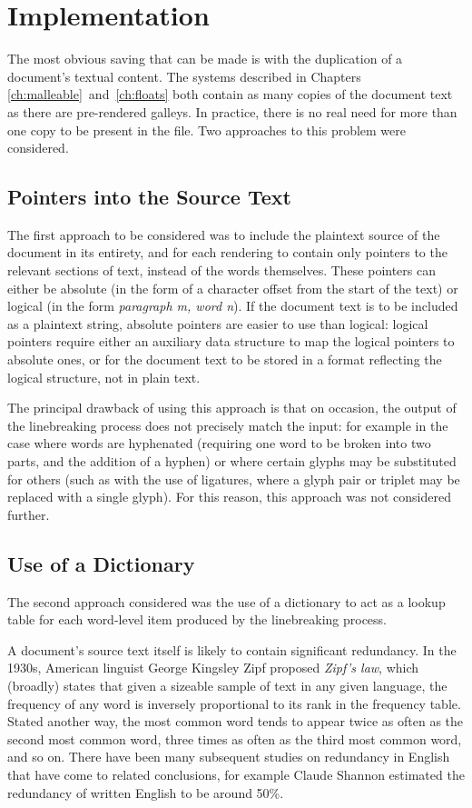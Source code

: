 \section{Implementation}
The most obvious saving that can be made is with the duplication of a document's textual content. The systems described in Chapters \ref{ch:malleable}~and~\ref{ch:floats} both contain as many copies of the document text as there are pre-rendered galleys. In practice, there is no real need for more than one copy to be present in the file. Two approaches to this problem were considered.

\subsection{Pointers into the Source Text}
The first approach to be considered was to include the plaintext source of the document in its entirety, and for each rendering to contain only pointers to the relevant sections of text, instead of the words themselves. These pointers can either be absolute (in the form of a character offset from the start of the text) or logical (in the form \emph{paragraph m, word n}). If the document text is to be included as a plaintext string, absolute pointers are easier to use than logical: logical pointers require either an auxiliary data structure to map the logical pointers to absolute ones, or for the document text to be stored in a format reflecting the logical structure, \ie{} not in plain text.

The principal drawback of using this approach is that on occasion, the output of the linebreaking process does not precisely match the input: for example in the case where words are hyphenated (requiring one word to be broken into two parts, and the addition of a hyphen) or where certain glyphs may be substituted for others (such as with the use of ligatures, where a glyph pair or triplet may be replaced with a single glyph). For this reason, this approach was not considered further.


\subsection{Use of a Dictionary}
\label{sec:dictionary}
The second approach considered was the use of a dictionary to act as a lookup table for each word-level item produced by the linebreaking process.

A document's source text itself is likely to contain significant redundancy. In the 1930s, American linguist George Kingsley Zipf proposed \emph{Zipf's law},\hspace{0pt}\cite{zipf1932} which (broadly) states that given a sizeable sample of text in any given language, the frequency of any word is inversely proportional to its rank in the frequency table. Stated another way, the most common word tends to appear twice as often as the second most common word, three times as often as the third most common word, and so on. There have been many subsequent studies on redundancy in English that have come to related conclusions, for example Claude Shannon estimated the redundancy of written English to be around 50\%.\hspace{0pt}\cite{Shannon1951, Hirst1988}

